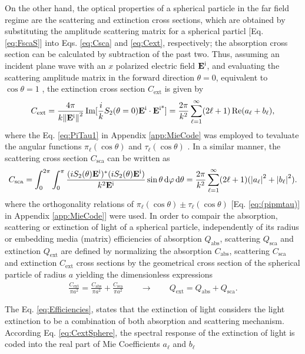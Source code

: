 On the other hand, the optical properties of  a spherical particle in the far field regime are  the scattering and extinction cross sections, which are obtained by substituting the amplitude scattering matrix for a spherical particl [Eq. \eqref{eq:FscaS}]  into Eqs. \eqref{eq:Csca} and \eqref{eq:Cext}, respectively; the absorption cross section can be calculated by subtraction of the past two. Thus, assuming an incident plane wave with an $x$ polarized electric field $\vb{E}^\text{i}$, and evaluating the scattering amplitude matrix in the forward direction $\theta = 0$, equivalent to $\cos\theta = 1$ , the extinction cross section $C_\text{ext}$ is given by
\begin{align}
	C_\text{ext} = \frac{4\pi}{k \norm{\vb{E}^\text{i}}^2}\Im[\frac{i}{k}S_2(\theta = 0)\vb{E}^\text{i}\cdot\vb{E}^\text{i*}]
	  			 = \frac{2 \pi}{k^2}\sum_{\ell = 1}^\infty (2 \ell + 1) \Re(a_\ell + b_\ell),
	\label{eq:CextSphere}
\end{align}
where the Eq. \eqref{eq:PiTau1} in Appendix \ref{app:MieCode} was employed to tevaluate the angular functions $\pi_\ell(\cos\theta)$ and $\tau_\ell(\cos\theta)$ . In a similar manner, the scattering cross section $C_\text{sca}$  can be written as
%
\begin{align}
C_\text{sca} = \int_0^{2\pi}\int_0^\pi  \frac{(iS_2(\theta)\vb{E}^\text{i})^*(iS_2(\theta)\vb{E}^\text{i})}{k^2\vb{E}^\text{i}} \sin\theta\dd{\varphi}\dd{\theta}
			 = \frac{2 \pi}{k^2}\sum_{\ell = 1}^\infty (2 \ell + 1) (\abs{a_\ell}^2 + \abs{b_\ell}^2).
	\label{eq:CscaSphere}
\end{align}
%
where the orthogonality relations of $\pi_\ell(\cos\theta)\pm\tau_\ell(\cos\theta)$ [Eq. \eqref{eq:(pipmtau)} in Appendix \ref{app:MieCode}] were used. In order to compair the absorption, scattering or extinction of light of a spherical particle, independently of its radius or embedding media (matrix) efficiencies of  absorption $Q_\text{abs}$, scattering $Q_\text{sca}$ and extinction $Q_\text{ext}$ are defined by normalizing the   absorption $C_\text{abs}$, scattering $C_\text{sca}$ and extinction $C_\text{ext}$ cross sections by the geometrical cross section of the spherical particle of radius $a$ yielding the dimensionless expressions
%
\begin{align}
 	\frac{C_\text{ext}}{\pi a^2} =   \frac{C_\text{abs}}{\pi a^2}  + \frac{C_\text{sca}}{\pi a^2}
 		\qquad \longrightarrow \qquad
	Q_\text{ext} =    Q_\text{abs}  +  Q_\text{sca}.
	\label{eq:Efficiencies}
\end{align}
%

The Eq. \eqref{eq:Efficiencies}, states that the extinction of light considers  the light extinction to be a combination of both absorption and scattering mechanism. According Eq. \eqref{eq:CextSphere}, the spectral response of the extinction of light is coded into the real part of Mie Coefficients $a_\ell$ and $b_\ell$ {}
